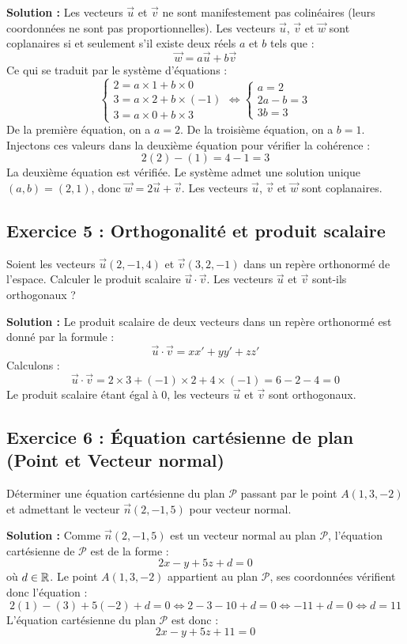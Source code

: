 \textbf{Solution :}
Les vecteurs $\vec{u}$ et $\vec{v}$ ne sont manifestement pas colinéaires (leurs coordonnées ne sont pas proportionnelles).
Les vecteurs $\vec{u}$, $\vec{v}$ et $\vec{w}$ sont coplanaires si et seulement s'il existe deux réels $a$ et $b$ tels que :
\[
\vec{w} = a \vec{u} + b \vec{v}
\]
Ce qui se traduit par le système d'équations :
\[
\begin{cases}
2 = a \times 1 + b \times 0 \\
3 = a \times 2 + b \times (-1) \\
3 = a \times 0 + b \times 3
\end{cases} \iff
\begin{cases}
a = 2 \\
2a - b = 3 \\
3b = 3
\end{cases}
\]
De la première équation, on a $a = 2$.
De la troisième équation, on a $b = 1$.
Injectons ces valeurs dans la deuxième équation pour vérifier la cohérence :
\[
2(2) - (1) = 4 - 1 = 3
\]
La deuxième équation est vérifiée. Le système admet une solution unique $(a, b) = (2, 1)$, donc $\vec{w} = 2\vec{u} + \vec{v}$.
Les vecteurs $\vec{u}$, $\vec{v}$ et $\vec{w}$ sont coplanaires.

\subsection*{Exercice 5 : Orthogonalité et produit scalaire}
Soient les vecteurs $\vec{u}(2, -1, 4)$ et $\vec{v}(3, 2, -1)$ dans un repère orthonormé de l'espace. Calculer le produit scalaire $\vec{u} \cdot \vec{v}$. Les vecteurs $\vec{u}$ et $\vec{v}$ sont-ils orthogonaux ?

\textbf{Solution :}
Le produit scalaire de deux vecteurs dans un repère orthonormé est donné par la formule :
\[
\vec{u} \cdot \vec{v} = x x' + y y' + z z'
\]
Calculons :
\[
\vec{u} \cdot \vec{v} = 2 \times 3 + (-1) \times 2 + 4 \times (-1) = 6 - 2 - 4 = 0
\]
Le produit scalaire étant égal à 0, les vecteurs $\vec{u}$ et $\vec{v}$ sont orthogonaux.

\subsection*{Exercice 6 : Équation cartésienne de plan (Point et Vecteur normal)}
Déterminer une équation cartésienne du plan $\mathcal{P}$ passant par le point $A(1, 3, -2)$ et admettant le vecteur $\vec{n}(2, -1, 5)$ pour vecteur normal.

\textbf{Solution :}
Comme $\vec{n}(2, -1, 5)$ est un vecteur normal au plan $\mathcal{P}$, l'équation cartésienne de $\mathcal{P}$ est de la forme :
\[
2x - y + 5z + d = 0
\]
où $d \in \mathbb{R}$.
Le point $A(1, 3, -2)$ appartient au plan $\mathcal{P}$, ses coordonnées vérifient donc l'équation :
\[
2(1) - (3) + 5(-2) + d = 0 \iff 2 - 3 - 10 + d = 0 \iff -11 + d = 0 \iff d = 11
\]
L'équation cartésienne du plan $\mathcal{P}$ est donc :
\[
2x - y + 5z + 11 = 0
\]

